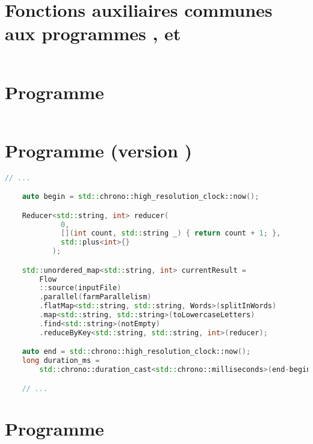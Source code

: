 \section{Fonctions auxiliaires communes aux programmes ,
 et }

\begin{lstlisting}[basicstyle=\ttfamily\footnotesize,language=c++]
\end{lstlisting}


\section{Programme }
\begin{lstlisting}[basicstyle=\ttfamily\footnotesize,language=c++]
\end{lstlisting}

\section{Programme  (version \ppff)}
\begin{lstlisting}[basicstyle=\ttfamily\footnotesize,language=c++]
    // ...

    auto begin = std::chrono::high_resolution_clock::now();

    Reducer<std::string, int> reducer(
             0, 
             [](int count, std::string _) { return count + 1; },
             std::plus<int>{}
           );

    std::unordered_map<std::string, int> currentResult = 
        Flow
        ::source(inputFile)
        .parallel(farmParallelism)
        .flatMap<std::string, std::string, Words>(splitInWords)			
        .map<std::string, std::string>(toLowercaseLetters)			
        .find<std::string>(notEmpty)	
        .reduceByKey<std::string, std::string, int>(reducer);  

    auto end = std::chrono::high_resolution_clock::now();
    long duration_ms = 
        std::chrono::duration_cast<std::chrono::milliseconds>(end-begin).count();

    // ...
\end{lstlisting}

\section{Programme }
\begin{lstlisting}[basicstyle=\ttfamily\footnotesize,language=c++]
\end{lstlisting}
